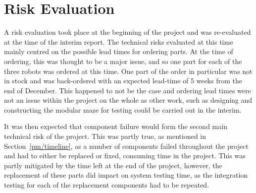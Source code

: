 \section{Risk Evaluation}\label{pm/riskeval}
A risk evaluation took place at the beginning of the project and 
was re-evaluated at the time of the interim report. The technical 
risks evaluated at this time mainly centred on the possible lead 
times for ordering parts. At the time of ordering, this was 
thought to be a major issue, and so one part for each of the three 
robots was ordered at this time. One part of the order in 
particular was not in stock and was back-ordered with an expected 
lead-time of 5 weeks from the end of December. This happened to 
not be the case and ordering lead times were not an issue within 
the project on the whole as other work, such as designing and 
constructing the modular maze for testing could be carried out in 
the interim. 

It was then expected that component failure would form the second 
main technical risk of the project. This was partly true, as 
mentioned in Section~\ref{pm/timeline}, as a number of components 
failed throughout the project and had to either be replaced or 
fixed, consuming time in the project. This was partly mitigated by 
the time left at the end of the project, however, the replacement 
of these parts did impact on system testing time, as the 
integration testing for each of the replacement components had to 
be repeated. 


